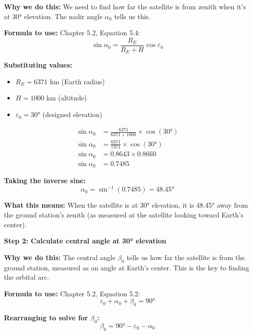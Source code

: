 \documentclass[11pt,letterpaper]{article}
\begin{document}
\textbf{Why we do this:} We need to find how far the satellite is from zenith when it's at 30° elevation. The nadir angle $\alpha_0$ tells us this.

\textbf{Formula to use:} Chapter 5.2, Equation 5.4:
\begin{equation}
\sin \alpha_0 = \frac{R_E}{R_E + H} \cos \varepsilon_0
\end{equation}

\textbf{Substituting values:}
\begin{itemize}
    \item $R_E = 6371$ km (Earth radius)
    \item $H = 1000$ km (altitude)
    \item $\varepsilon_0 = 30°$ (designed elevation)
\end{itemize}

\begin{align}
\sin \alpha_0 &= \frac{6371}{6371 + 1000} \times \cos(30°) \\
\sin \alpha_0 &= \frac{6371}{7371} \times \cos(30°) \\
\sin \alpha_0 &= 0.8643 \times 0.8660 \\
\sin \alpha_0 &= 0.7485
\end{align}

\textbf{Taking the inverse sine:}
\begin{equation}
\alpha_0 = \sin^{-1}(0.7485) = 48.45°
\end{equation}

\textbf{What this means:} When the satellite is at 30° elevation, it is 48.45° away from the ground station's zenith (as measured at the satellite looking toward Earth's center).

\vspace{0.3cm}

\textbf{Step 2: Calculate central angle at 30° elevation}

\textbf{Why we do this:} The central angle $\beta_0$ tells us how far the satellite is from the ground station, measured as an angle at Earth's center. This is the key to finding the orbital arc.

\textbf{Formula to use:} Chapter 5.2, Equation 5.2:
\begin{equation}
\varepsilon_0 + \alpha_0 + \beta_0 = 90°
\end{equation}

\textbf{Rearranging to solve for $\beta_0$:}
\begin{equation}
\beta_0 = 90° - \varepsilon_0 - \alpha_0
\end{equation}
\end{document}
